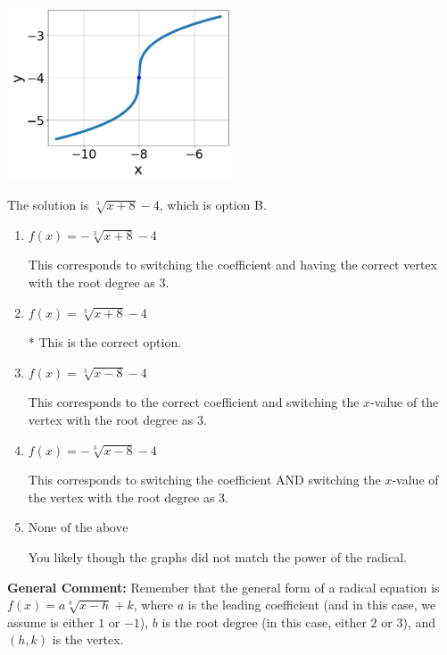 \documentclass{extbook}[14pt]
\begin{document}
\begin{enumerate}
{\begin{center}
    \includegraphics[width=0.5\textwidth]{../Figures/radicalGraphToEquationCopyB.png}
\end{center}




The solution is \( \sqrt[3]{x + 8} - 4 \), which is option B.\begin{enumerate}[label=\Alph*.]
\item \( f(x) = - \sqrt[3]{x + 8} - 4 \)

This corresponds to switching the coefficient and having the correct vertex with the root degree as $3$.
\item \( f(x) = \sqrt[3]{x + 8} - 4 \)

* This is the correct option.
\item \( f(x) = \sqrt[3]{x - 8} - 4 \)

This corresponds to the correct coefficient and switching the $x$-value of the vertex with the root degree as $3$.
\item \( f(x) = - \sqrt[3]{x - 8} - 4 \)

This corresponds to switching the coefficient AND switching the $x$-value of the vertex with the root degree as $3$.
\item \( \text{None of the above} \)

You likely though the graphs did not match the power of the radical.
\end{enumerate}

\textbf{General Comment:} Remember that the general form of a radical equation is $ f(x) = a \sqrt[b]{x - h} + k$, where $a$ is the leading coefficient (and in this case, we assume is either $1$ or $-1$), $b$ is the root degree (in this case, either $2$ or $3$), and $(h, k)$ is the vertex.
}
\end{enumerate}
\end{document}
